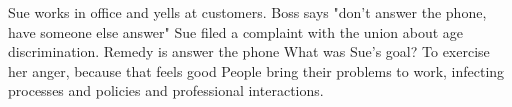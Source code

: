 Sue works in office and yells at customers. Boss says "don't answer the phone, have someone else answer"
Sue filed a complaint with the union about age discrimination. Remedy is answer the phone
What was Sue's goal? To exercise her anger, because that feels good
People bring their problems to work, infecting processes and policies and professional interactions.
